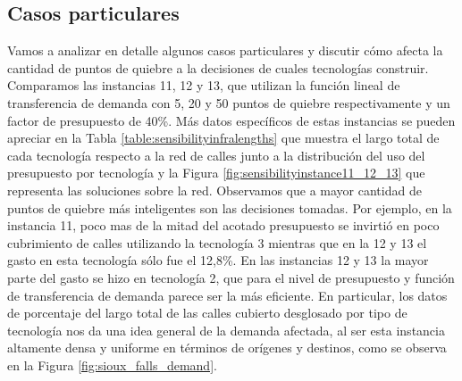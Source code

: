 \clearpage
\subsection*{Casos particulares}

Vamos a analizar en detalle algunos casos particulares y discutir cómo afecta la cantidad de puntos de quiebre a la decisiones de cuales tecnologías construir. Comparamos las instancias 11, 12 y 13, que utilizan la función lineal de transferencia de demanda con 5, 20 y 50 puntos de quiebre respectivamente y un factor de presupuesto de 40\%. Más datos específicos de estas instancias se pueden apreciar en la Tabla \ref{table:sensibilityinfralengths} que muestra el largo total de cada tecnología respecto a la red de calles junto a la distribución del uso del presupuesto por tecnología y la Figura \ref{fig:sensibilityinstance11_12_13} que representa las soluciones sobre la red. Observamos que a mayor cantidad de puntos de quiebre más inteligentes son las decisiones tomadas. Por ejemplo, en la instancia 11, poco mas de la mitad del acotado presupuesto se invirtió en poco cubrimiento de calles utilizando la tecnología 3 mientras que en la 12 y 13 el gasto en esta tecnología sólo fue el 12,8\%. En las instancias 12 y 13 la mayor parte del gasto se hizo en tecnología 2, que para el nivel de presupuesto y función de transferencia de demanda parece ser la más eficiente. En particular, los datos de porcentaje del largo total de las calles cubierto desglosado por tipo de tecnología nos da una idea general de la demanda afectada, al ser esta instancia altamente densa y uniforme en términos de orígenes y destinos, como se observa en la Figura \ref{fig:sioux_falls_demand}.


